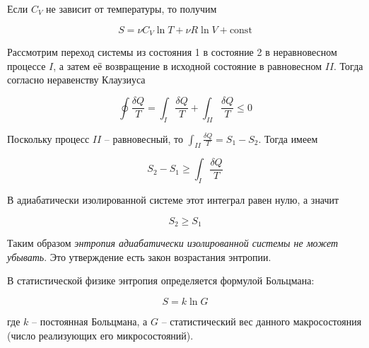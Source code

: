 \noindent
Если $C_V$ не зависит от температуры, то получим

\begin{equation}
    S = \nu C_V \ln T + \nu R \ln V + \text{const}
\end{equation}

Рассмотрим переход системы из состояния 1 в состояние 2 в неравновесном процессе $I$, а затем её возвращение в исходной состояние в равновесном $II$. Тогда согласно неравенству Клаузиуса

\begin{equation*}
    \oint \frac{\delta Q}{T} = \int_I \frac{\delta Q}{T} + \int_{II} \frac{\delta Q}{T} \leq 0
\end{equation*}

\noindent
Поскольку процесс $II$ -- равновесный, то $\int_{II} \frac{\delta Q}{T} = S_1 - S_2$. Тогда имеем

\begin{equation*}
    S_2 - S_1 \geq \int_I \frac{\delta Q}{T}
\end{equation*}

\noindent
В адиабатически изолированной системе этот интеграл равен нулю, а значит

\begin{equation}
    S_2 \geq S_1
\end{equation}

Таким образом \textit{энтропия адиабатически изолированной системы не может убывать}. Это утверждение есть закон возрастания энтропии.

В статистической физике энтропия определяется формулой Больцмана:

\begin{equation}
    S = k \ln G
\end{equation}

\noindent
где $k$ -- постоянная Больцмана, а $G$ -- статистический вес данного макросостояния (число реализующих его микросостояний).